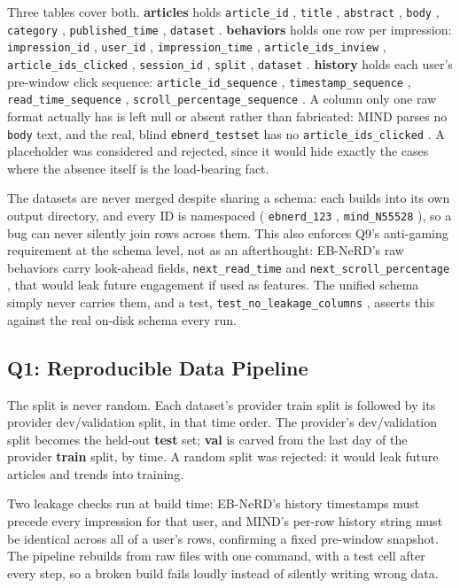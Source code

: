 \documentclass[11pt]{article}
\newcommand{\code}[1]{%
    \colorbox{gray!40}{\texttt{#1}}%
}
\begin{document}
\begin{sloppypar}
Three tables cover both. \textbf{articles} holds \code{article\_id}, \code{title},
\code{abstract}, \code{body}, \code{category}, \code{published\_time}, \code{dataset}.
\textbf{behaviors} holds one row per impression: \code{impression\_id}, \code{user\_id},
\code{impression\_time}, \code{article\_ids\_inview}, \code{article\_ids\_clicked},
\code{session\_id}, \code{split}, \code{dataset}. \textbf{history} holds each user's pre-window
click sequence: \code{article\_id\_sequence}, \code{timestamp\_sequence},
\code{read\_time\_sequence}, \code{scroll\_percentage\_sequence}. A column only one raw format
actually has is left null or absent rather than fabricated: MIND parses no \code{body} text, and
the real, blind \code{ebnerd\_testset} has no \code{article\_ids\_clicked}. A placeholder was
considered and rejected, since it would hide exactly the cases where the absence itself is the
load-bearing fact.

The datasets are never merged despite sharing a schema: each builds into its own output
directory, and every ID is namespaced (\code{ebnerd\_123}, \code{mind\_N55528}), so a bug can
never silently join rows across them. This also enforces Q9's anti-gaming requirement at the
schema level, not as an afterthought: EB-NeRD's raw behaviors carry look-ahead fields,
\code{next\_read\_time} and \code{next\_scroll\_percentage}, that would leak future engagement if
used as features. The unified schema simply never carries them, and a test,
\code{test\_no\_leakage\_columns}, asserts this against the real on-disk schema every run.
\end{sloppypar}

\subsection{Q1: Reproducible Data Pipeline}

The split is never random. Each dataset's provider train split is followed by its provider
dev/validation split, in that time order. The provider's dev/validation split becomes the
held-out \textbf{test} set; \textbf{val} is carved from the last day of the provider
\textbf{train} split, by time. A random split was rejected: it would leak future articles and
trends into training.

Two leakage checks run at build time: EB-NeRD's history timestamps must precede every impression
for that user, and MIND's per-row history string must be identical across all of a user's rows,
confirming a fixed pre-window snapshot. The pipeline rebuilds from raw files with one command,
with a test cell after every step, so a broken build fails loudly instead of silently writing
wrong data.
\end{document}
